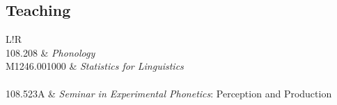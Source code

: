 \documentclass[a4paper,11pt]{article}
\newcommand\VRule{\color{lightgray}\vrule width 0.5pt}
\begin{document}
	\subsection*{Teaching}
	\begin{longtable}{L!{\VRule}R}
		\\
		108.208 & \textit{Phonology}\\
		M1246.001000 & \textit{Statistics for Linguistics}\\[10pt]
		\\
		108.523A & \textit{Seminar in Experimental Phonetics}: Perception and Production\\
	\end{longtable}
\end{document}
